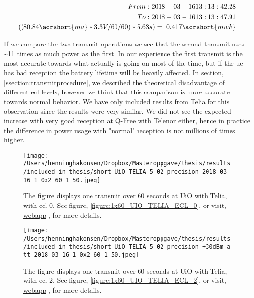\documentclass[USenglish]{ifimaster}  %
\begin{document}
\begin{equation} \label{equation:ecl2}
\begin{aligned}
From: 2018-03-16 13:13:42.28 \\
To: 2018-03-16 13:13:47.91 \\
((80.84\acrshort{ma} * 3.3V / 60 / 60 ) * 5.63s) = ~0.417\acrshort{mwh} \\
\end{aligned}
\end{equation}

If we compare the two transmit operations we see that the second transmit uses \textasciitilde{}11 times as much power as the first. In our experience the first transmit is the most accurate towards what actually is going on most of the time, but if the \acrshort{ue} has bad reception the battery lifetime will be heavily affected. In section, \vref{ssection:transmitprocedure}, we described the theoretical disadvantage of different \acrshort{ecl} levels, however we think that this comparison is more accurate towards normal behavior. We have only included results from Telia for this observation since the results were very similar. We did not see the expected increase with very good reception at Q-Free with Telenor either, hence in practice the difference in power usage with "normal" reception is not millions of times higher.

\begin{figure}[H]
  \centering
  \texttt{[image: /Users/henninghakonsen/Dropbox/Masteroppgave/thesis/results/included\_in\_thesis/short\_UiO\_TELIA\_5\_02\_precision\_2018-03-16\_1\_0x2\_60\_1\_50.jpeg]}
  \caption[Short-term test - \acrshort{ecl} 0]{The figure displays one transmit over 60 seconds at UiO with Telia, with \acrshort{ecl} 0. See figure, \vref{figure:1x60_UIO_TELIA_ECL_0}, or visit, \href{http://158.39.77.97:9000/\#/results/UiO\_TELIA\_5.02\_precision\_2018-03-16\_1\_0x2\_60\_1\_50}{webapp} \cite{online:result5}, for more details.}
  \label{figure:1x60_UIO_TELIA_ECL_0_SHORT}
\end{figure}

\begin{figure}[H]
  \centering
  \texttt{[image: /Users/henninghakonsen/Dropbox/Masteroppgave/thesis/results/included\_in\_thesis/short\_UiO\_TELIA\_5\_02\_precision\_+30dBm\_att\_2018-03-16\_1\_0x2\_60\_1\_50.jpeg]}
  \caption[Short-term test - \acrshort{ecl} 2]{The figure displays one transmit over 60 seconds at UiO with Telia, with \acrshort{ecl} 2. See figure, \vref{figure:1x60_UIO_TELIA_ECL_2}, or visit, \href{http://158.39.77.97:9000/\#/results/UiO\_TELIA\_5.02\_precision\_+30dBm\_att\_2018-03-16\_1\_0x2\_60\_1\_50}{webapp} \cite{online:result6}, for more details.}
  \label{figure:1x60_UIO_TELIA_ECL_2_SHORT}
\end{figure}
\end{document}

